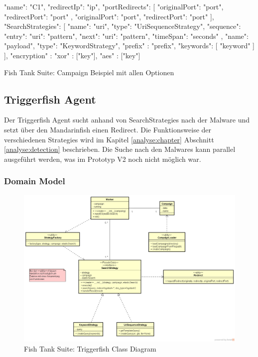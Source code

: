 \begin{listing}[H]
\begin{jscode}
{
  "name": "C1",
  "redirectIp": "ip",
  "portRedirects": [
    {
      "originalPort": "port",
      "redirectPort": "port"
    },
    {
      "originalPort": "port",
      "redirectPort": "port"
    }
  ],
  "SearchStrategies": [
    {
      "name": "uri",
      "type": "UriSequenceStrategy",
      "sequence": {
        "entry": {"uri": "pattern"},
        "next": {"uri": "pattern", "timeSpan": "seconds"}
      }
    },
    {
      "name": "payload",
      "type": "KeywordStrategy",
      "prefix" : "prefix",
      "keywords": [
        "keyword"
      ]
    }
  ],
  "encryption" : {
  	"xor" : ["key"],
  	"aes" : ["key"]
  }
}
\end{jscode}
\caption{Fish Tank Suite: Campaign Beispiel mit allen Optionen}
\label{lst:campaign-json-all-options}
\end{listing}



\subsection{Triggerfish Agent}
Der Triggerfish Agent sucht anhand von SearchStrategies nach der Malware und setzt über den Mandarinfish einen Redirect. Die Funktionsweise der verschiedenen Strategies wird im Kapitel \ref{analyse:chapter} Abschnitt \ref{analyse:detection} beschrieben. Die Suche nach den Malwares kann parallel ausgeführt werden, was im Prototyp V2 noch nicht möglich war.

\subsubsection{Domain Model}

\begin{figure}[H]
	\centering
	\includegraphics[width=\textwidth]{img/TriggerClassDiagram.png}
	\caption{Fish Tank Suite: Triggerfish Class Diagram}
	\label{fig:Triggerfish_Class_Diagram}
\end{figure}

